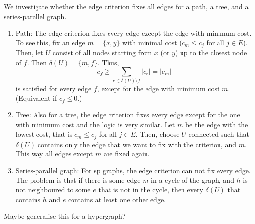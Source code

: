 We investigate whether the edge criterion fixes all edges for a path, a tree, and a series-parallel graph.
\begin{enumerate}
    \item Path: The edge criterion fixes every edge except the edge with minimum cost. To see this, fix an edge $m=\{x,y\}$ with minimal cost ($c_m \leq c_j$ for all $j \in E$). Then, let $U$ consist of all nodes starting from $x$ (or $y$) up to the closest node of $f$. Then $\delta(U)=\{m, f\}$. Thus, \[ c_f \geq \sum_{e \in \delta(U) \setminus f} |c_e|=|c_m| \] is satisfied for every edge $f$, except for the edge with minimum cost $m$. (Equivalent if $c_f \leq 0$.)
    
    \item Tree: Also for a tree, the edge criterion fixes every edge except for the one with minimum cost and the logic is very similar. Let $m$ be the edge with the lowest cost, that is $c_m \leq c_j$ for all $j \in E$. Then, choose $U$ connected such that $\delta(U)$ contains only the edge that we want to fix with the criterion, and $m$. This way all edges except $m$ are fixed again.  
    
    \item Series-parallel graph: For sp graphs, the edge criterion can not fix every edge. The problem is that if there is some edge $m$ in a cycle of the graph, and $h$ is not neighboured to some $e$ that is not in the cycle, then every $\delta(U)$ that contains $h$ and $e$ contains at least one other edge. 
\end{enumerate}
Maybe generalise this for a hypergraph? 
